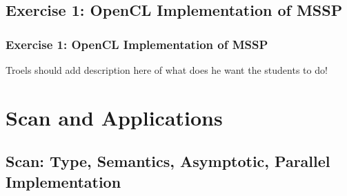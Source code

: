 \documentclass{beamer}
\begin{document}
\subsection{Exercise 1: OpenCL Implementation of MSSP}

\begin{frame}[fragile,t]
  \frametitle{Exercise 1: OpenCL Implementation of MSSP}

Troels should add description here of what does he want the students to do!
\end{frame}

\section{Scan and Applications}

\begin{frame}
  \tableofcontents[currentsection]
\end{frame}

\subsection{Scan: Type, Semantics, Asymptotic, Parallel Implementation}
\end{document}
